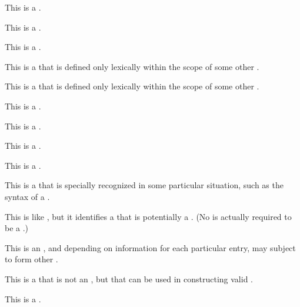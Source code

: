
This is a .


This is a .


This is a .


This is a  that is defined only lexically within the scope of some
other .


This is a  that is defined only lexically within the scope of some
other .


This is a .


This is a .


This is a .


This is a .


This is a  that is specially recognized in some particular situation,
such as the syntax of a .


This is like , but it identifies a  that is potentially
a .  (No  is actually required to be a
.)


This is an ,
and depending on information for each particular entry,
may subject to form other .


This is a  that is not an ,
but that can be used in constructing valid .


This is a .

\endlist

